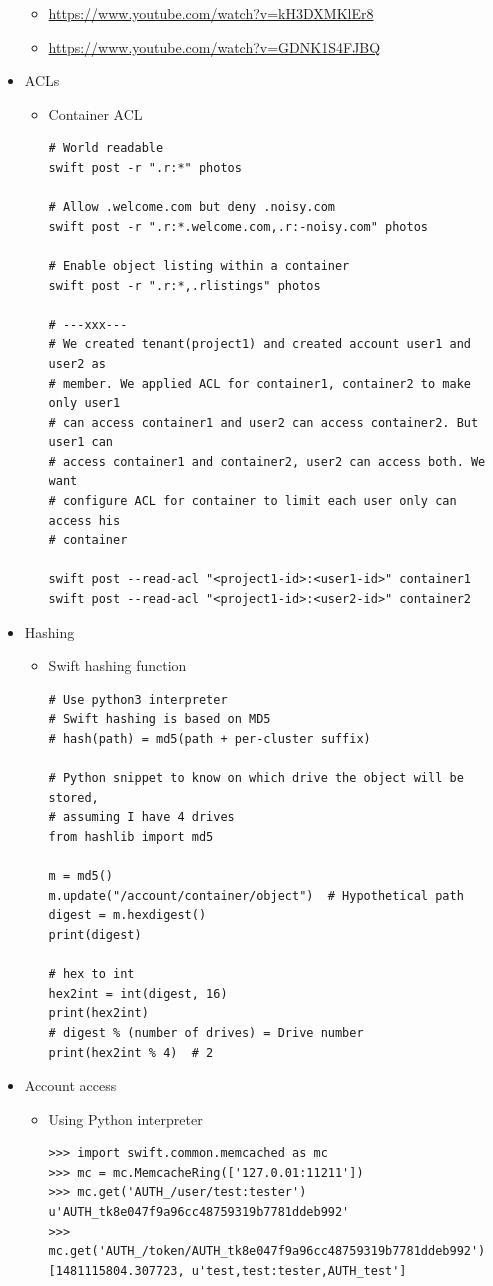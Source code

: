 \documentclass{article}
\begin{document}
\begin{itemize}
\begin{itemize}
\item \url{https://www.youtube.com/watch?v=kH3DXMKlEr8}
\item \url{https://www.youtube.com/watch?v=GDNK1S4FJBQ}
\end{itemize}

\item ACLs
\begin{itemize}
\item Container ACL
\begin{verbatim}
# World readable
swift post -r ".r:*" photos

# Allow .welcome.com but deny .noisy.com
swift post -r ".r:*.welcome.com,.r:-noisy.com" photos

# Enable object listing within a container
swift post -r ".r:*,.rlistings" photos

# ---xxx---
# We created tenant(project1) and created account user1 and user2 as
# member. We applied ACL for container1, container2 to make only user1
# can access container1 and user2 can access container2. But user1 can
# access container1 and container2, user2 can access both. We want
# configure ACL for container to limit each user only can access his
# container

swift post --read-acl "<project1-id>:<user1-id>" container1
swift post --read-acl "<project1-id>:<user2-id>" container2
\end{verbatim}
\end{itemize}

\item Hashing
\begin{itemize}
\item Swift hashing function
\begin{verbatim}
# Use python3 interpreter
# Swift hashing is based on MD5
# hash(path) = md5(path + per-cluster suffix)

# Python snippet to know on which drive the object will be stored,
# assuming I have 4 drives
from hashlib import md5

m = md5()
m.update("/account/container/object")  # Hypothetical path
digest = m.hexdigest()
print(digest)

# hex to int
hex2int = int(digest, 16)
print(hex2int)
# digest % (number of drives) = Drive number
print(hex2int % 4)  # 2
\end{verbatim}
\end{itemize}

\item Account access
\begin{itemize}
\item Using Python interpreter
\begin{verbatim}
>>> import swift.common.memcached as mc
>>> mc = mc.MemcacheRing(['127.0.01:11211'])
>>> mc.get('AUTH_/user/test:tester')
u'AUTH_tk8e047f9a96cc48759319b7781ddeb992'
>>> mc.get('AUTH_/token/AUTH_tk8e047f9a96cc48759319b7781ddeb992')
[1481115804.307723, u'test,test:tester,AUTH_test']
\end{verbatim}


\end{itemize}
\end{itemize}
\end{document}
